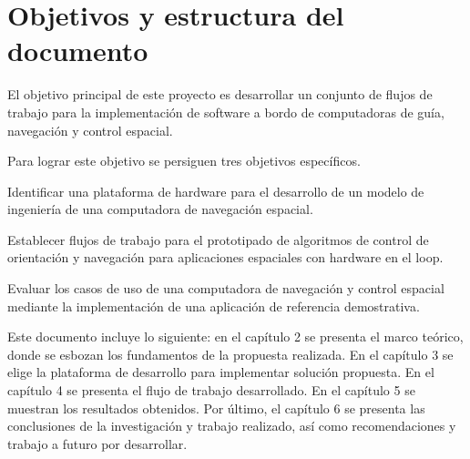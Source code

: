 \section{Objetivos y estructura del documento}

El objetivo principal de este proyecto es desarrollar un conjunto de flujos de trabajo para la implementación de software a bordo de computadoras de guía, navegación y control espacial. 

Para lograr este objetivo se persiguen tres objetivos específicos. 

Identificar una plataforma de hardware para el desarrollo de un modelo de ingeniería de una computadora de navegación espacial.

Establecer flujos de trabajo para el prototipado de algoritmos de control de orientación y navegación para aplicaciones espaciales con hardware en el loop. 

Evaluar los casos de uso de una computadora de navegación y control espacial mediante la implementación de una aplicación de referencia demostrativa.

Este documento incluye lo siguiente: en el capítulo 2 se presenta el marco teórico, donde se esbozan los fundamentos de la propuesta realizada. En el capítulo 3 se elige la plataforma de desarrollo para implementar solución propuesta. En el capítulo 4 se presenta el flujo de trabajo desarrollado. En el capítulo 5 se muestran los resultados obtenidos. Por último, el capítulo 6 se presenta las conclusiones de la investigación y trabajo realizado, así como recomendaciones y trabajo a futuro por desarrollar.

